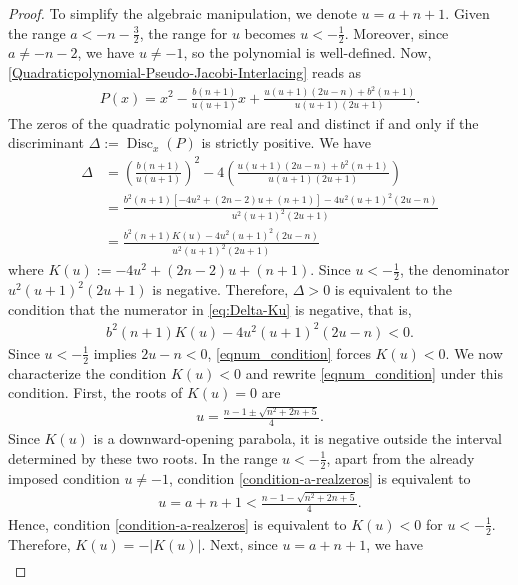 \documentclass[final,3p,times,12pt]{elsarticle}
\numberwithin{equation}{section}  %
\begin{document}
    \begin{proof} 
	To simplify the algebraic manipulation, we denote $	u=a+n+1.$
	Given the range $a<-n-\frac{3}{2}$, the range for $u$ becomes $u<-\frac{1}{2}$. Moreover, since $a\neq -n-2$, we have $u\neq -1$, so the polynomial is well-defined. Now, \eqref{Quadraticpolynomial-Pseudo-Jacobi-Interlacing} reads as
	\begin{align*}
		P(x)	=	x^2	-	\frac{b(n+1)}{u(u+1)}x	+	\frac{u(u+1)(2u-n)+b^2(n+1)}	{u(u+1)(2u+1)}.
	\end{align*}
	The zeros of the quadratic polynomial are real and distinct if and only if the discriminant $\Delta:=\operatorname{Disc}_x(P)$ is strictly positive. We have
	\begin{align}
		\Delta	&=	\left(\frac{b(n+1)}{u(u+1)}\right)^2	-	4\left(
	\frac{u(u+1)(2u-n)+b^2(n+1)}
		{u(u+1)(2u+1)}
		\right) \nonumber	\\&=	\frac{
			b^2(n+1)\left[-4u^2+(2n-2)u+(n+1)\right]-	4u^2(u+1)^2(2u-n)}
		{u^2(u+1)^2(2u+1)}\nonumber \\&
\label{eq:Delta-Ku}
	=\frac{	b^2(n+1)K(u)-4u^2(u+1)^2(2u-n)	}
		{u^2(u+1)^2(2u+1)}
	\end{align}
	where $	K(u):=-4u^2+(2n-2)u+(n+1)$.
	Since $u<-\frac{1}{2}$, the denominator $u^2(u+1)^2(2u+1)$ is negative. Therefore, $\Delta>0$ is equivalent to the condition that  the numerator in \eqref{eq:Delta-Ku} is negative, that is,
	\begin{align}	\label{eqnum_condition}
		b^2(n+1)K(u)-4u^2(u+1)^2(2u-n)
		< 0.
	\end{align}
    Since $u<-\frac{1}{2}$ implies $ 2u-n<0$, \eqref{eqnum_condition} forces $K(u)<0$.
		 We now characterize the condition $K(u)<0$ and rewrite \eqref{eqnum_condition} under this condition. First, the roots of $K(u)=0$ are
	\begin{align*}
		u	=	\frac{n-1\pm\sqrt{n^2+2n+5}}{4}.
	\end{align*}
	Since $K(u)$ is a downward-opening parabola, it is negative outside the interval determined by these two roots. In the range $u<-\frac{1}{2}$, apart from the already imposed condition $u\neq -1$, condition \eqref{condition-a-realzeros} is equivalent to
	\begin{align*}
		u	=	a+n+1	<	\frac{n-1-\sqrt{n^2+2n+5}}{4}.
	\end{align*}
	Hence, condition \eqref{condition-a-realzeros} is equivalent to $K(u)<0$ for $u<-\frac{1}{2}$.
	Therefore, $K(u)=-|K(u)|$.	Next, since $u=a+n+1$, we have
	\begin{align*}

\end{align*}
\end{proof}
\end{document}
